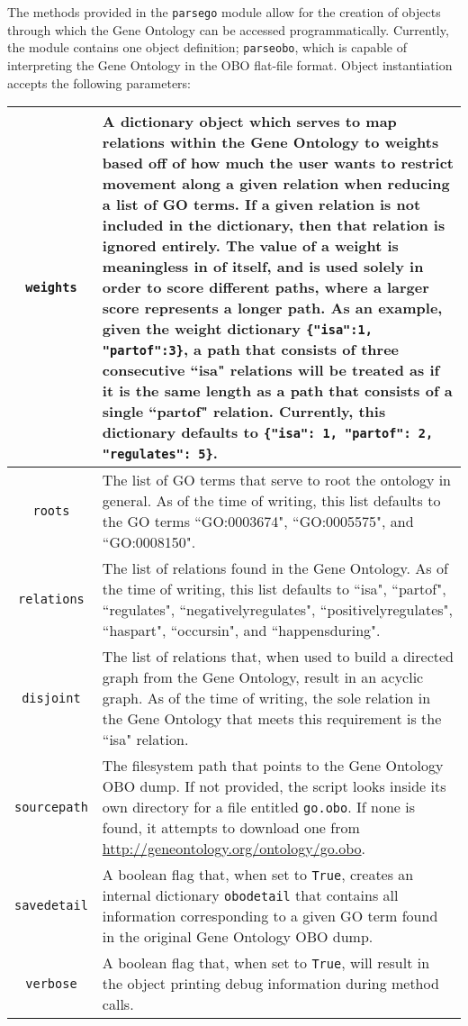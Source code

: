 \documentclass[10pt,a4paper,notitlepage]{article}
\newcommand\ttscore[0]{\underline{\hspace{0.2cm}}}
\begin{document}
The methods provided in the \texttt{parse\ttscore go} module allow for the creation of objects through which the Gene Ontology can be accessed programmatically. Currently, the module contains one object definition; \texttt{parse\ttscore obo}, which is capable of interpreting the Gene Ontology in the OBO flat-file format. Object instantiation accepts the following parameters:

\noindent \begin{tabular}{|c|p{5.22in}|} \hline
  \texttt{weights} &
  A dictionary object which serves to map relations within the Gene Ontology to weights based off of how much the user wants to restrict movement along a given relation when reducing a list of GO terms. If a given relation is not included in the dictionary, then that relation is ignored entirely. The value of a weight is meaningless in of itself, and is used solely in order to score different paths, where a larger score represents a longer path. As an example, given the weight dictionary \texttt{\{"is\ttscore a":1, "part\ttscore of":3\}}, a path that consists of three consecutive ``is\ttscore a" relations will be treated as if it is the same length as a path that consists of a single ``part\ttscore of" relation. Currently, this dictionary defaults to \texttt{\{"is\ttscore a":\ 1, "part\ttscore of":\ 2, "regulates":\ 5\}}.
  \\ \hline
  \texttt{roots} &
  The list of GO terms that serve to root the ontology in general. As of the time of writing, this list defaults to the GO terms ``GO:0003674", ``GO:0005575", and ``GO:0008150".
  \\ \hline
  \texttt{relations} &
  The list of relations found in the Gene Ontology. As of the time of writing, this list defaults to ``is\ttscore a", ``part\ttscore of", ``regulates", ``negatively\ttscore regulates", ``positively\ttscore regulates", ``has\ttscore part", ``occurs\ttscore in", and ``happens\ttscore during".
  \\ \hline
  \texttt{disjoint} &
  The list of relations that, when used to build a directed graph from the Gene Ontology, result in an acyclic graph. As of the time of writing, the sole relation in the Gene Ontology that meets this requirement is the ``is\ttscore a" relation.
  \\ \hline
  \texttt{source\ttscore path} &
  The filesystem path that points to the Gene Ontology OBO dump. If not provided, the script looks inside its own directory for a file entitled \texttt{go.obo}. If none is found, it attempts to download one from \url{http://geneontology.org/ontology/go.obo}.
  \\ \hline
  \texttt{save\ttscore detail} &
  A boolean flag that, when set to \texttt{True}, creates an internal dictionary \texttt{obo\ttscore detail} that contains all information corresponding to a given GO term found in the original Gene Ontology OBO dump.
  \\ \hline
  \texttt{verbose} &
  A boolean flag that, when set to \texttt{True}, will result in the object printing debug information during method calls.
  \\ \hline
\end{tabular}\\
\end{document}
